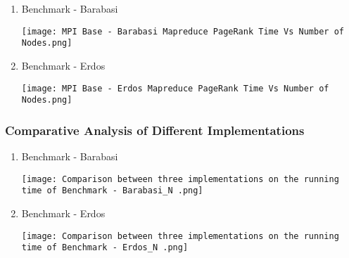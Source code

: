 \documentclass{article}
\begin{document}
    \begin{enumerate}
        \item Benchmark - Barabasi
        \begin{center}
            \texttt{[image: MPI Base - Barabasi Mapreduce PageRank Time Vs Number of Nodes.png]}
        \end{center}
            
        
        \item Benchmark - Erdos
        \begin{center}
            \texttt{[image: MPI Base - Erdos Mapreduce PageRank Time Vs Number of Nodes.png]}
        \end{center}
    \end{enumerate}
    
    \clearpage
    
    \subsubsection{Comparative Analysis of Different Implementations}
    \begin{enumerate}
        \item Benchmark - Barabasi
        \begin{center}
            \texttt{[image: Comparison between three implementations on the running time of Benchmark - Barabasi\_N .png]}
        \end{center}
        
        \item Benchmark - Erdos
        \begin{center}
            \texttt{[image: Comparison between three implementations on the running time of Benchmark - Erdos\_N .png]}
        \end{center}
    \end{enumerate}
    
    \clearpage
    
\end{document}
